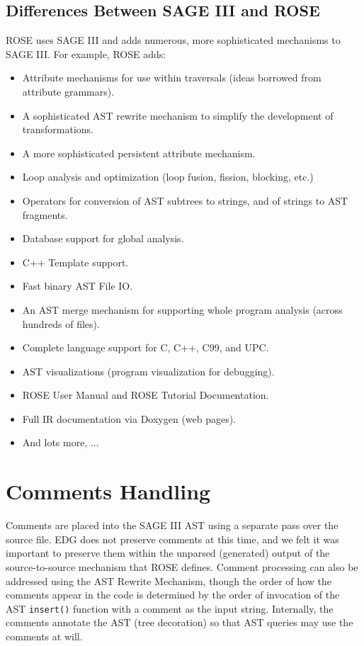 \subsection{Differences Between SAGE III and ROSE}
   ROSE uses SAGE III and adds numerous, more sophisticated mechanisms to SAGE III.
For example, ROSE adds:
\begin{itemize}
    \item Attribute mechanisms for use within traversals (ideas borrowed 
          from attribute grammars).
    \item A sophisticated AST rewrite mechanism to simplify the development 
          of transformations.
    \item A more sophisticated persistent attribute mechanism.
    \item Loop analysis and optimization (loop fusion, fission, blocking, etc.)
    \item Operators for conversion of AST subtrees to strings, and of strings 
          to AST fragments.
    \item Database support for global analysis.
    \item C++ Template support.
    \item Fast binary AST File I\/O.
    \item An AST merge mechanism for supporting whole program analysis
          (across hundreds of files).
    \item Complete language support for C, C++, C99, and UPC.
    \item AST visualizations (program visualization for debugging).
    \item ROSE User Manual and ROSE Tutorial Documentation.
    \item Full IR documentation via Doxygen (web pages).
    \item And lots more, ...
\end{itemize}

\section {Comments Handling}

    Comments are placed into the SAGE III AST using a separate pass over the source file.
EDG does not preserve comments at this time, and we felt it was important to preserve them
within the unparsed (generated) output of the source-to-source mechanism that ROSE defines.
Comment processing can also be addressed using the AST Rewrite Mechanism, though
the order of how the comments appear in the code is determined by the order of 
invocation of the AST {\tt insert()} function with a comment as the input string.
Internally, the comments annotate the AST (tree decoration) so that AST queries may use 
the comments at will.

